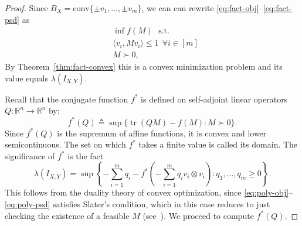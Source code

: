 \documentclass[12pt]{article}
\newcommand{\R}{{\mathbb{R}}}
\newcommand{\eqdef}{\triangleq}
\DeclareMathOperator{\tr}{tr}
\begin{document}
\begin{proof}
  Since $B_X = \mathrm{conv}\{\pm v_1, \ldots, \pm v_m\}$, we can can
  rewrite \eqref{eq:fact-obj}--\eqref{eq:fact-psd} as
  \begin{align}
    &\inf f(M)\ \ \ 
    \text{s.t.}\label{eq:poly-obj}\\
    &\langle v_i, Mv_i\rangle \le 1 \ \ \forall i \in [m]\\
    &M \succ 0\label{eq:poly-psd},
  \end{align}
  By Theorem~\ref{thm:fact-convex} this is a convex minimization problem
  and its value equals $\lambda(I_{X,Y})$.

  Recall that the conjugate function $f^*$ is defined on self-adjoint
  linear operators $Q:\R^n \to \R^n$ by:
  \[
  f^*(Q) \eqdef \sup\{\tr(QM) - f(M): M \succ 0\}.
  \]
  Since $f^*(Q)$ is the supremum of affine functions, it is convex and
  lower semicontinuous. The set on which $f^*$ takes a finite value is
  called its domain. The significance of $f^*$ is the fact
  \begin{equation}\label{eq:lagrange}
  \lambda(I_{X,Y}) = 
  \sup\left\{-\sum_{i = 1}^m{q_i} - 
    f^*\left(-\sum_{i = 1}^m{q_i v_i\otimes v_i}\right):
      q_1, \ldots, q_m \ge 0\right\}.
  \end{equation}
  This follows from the duality theory of convex optimization, since
  \eqref{eq:poly-obj}--\eqref{eq:poly-psd} satisfies Slater's
  condition, which in this case reduces to just checking the existence
  of a feasible $M$ (see~\cite[Chapter 5]{BoydV04}). We proceed to
  compute $f^*(Q)$.


\end{proof}
\end{document}
